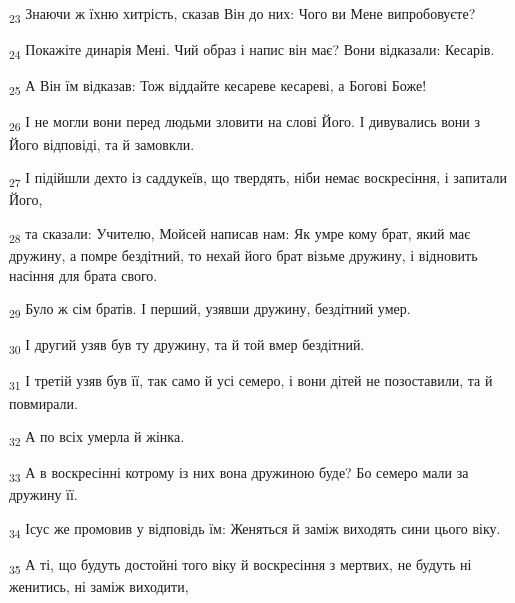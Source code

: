 \begin{tcolorbox}
\textsubscript{23} Знаючи ж їхню хитрість, сказав Він до них: Чого ви Мене випробовуєте?
\end{tcolorbox}
\begin{tcolorbox}
\textsubscript{24} Покажіте динарія Мені. Чий образ і напис він має? Вони відказали: Кесарів.
\end{tcolorbox}
\begin{tcolorbox}
\textsubscript{25} А Він їм відказав: Тож віддайте кесареве кесареві, а Богові Боже!
\end{tcolorbox}
\begin{tcolorbox}
\textsubscript{26} І не могли вони перед людьми зловити на слові Його. І дивувались вони з Його відповіді, та й замовкли.
\end{tcolorbox}
\begin{tcolorbox}
\textsubscript{27} І підійшли дехто із саддукеїв, що твердять, ніби немає воскресіння, і запитали Його,
\end{tcolorbox}
\begin{tcolorbox}
\textsubscript{28} та сказали: Учителю, Мойсей написав нам: Як умре кому брат, який має дружину, а помре бездітний, то нехай його брат візьме дружину, і відновить насіння для брата свого.
\end{tcolorbox}
\begin{tcolorbox}
\textsubscript{29} Було ж сім братів. І перший, узявши дружину, бездітний умер.
\end{tcolorbox}
\begin{tcolorbox}
\textsubscript{30} І другий узяв був ту дружину, та й той вмер бездітний.
\end{tcolorbox}
\begin{tcolorbox}
\textsubscript{31} І третій узяв був її, так само й усі семеро, і вони дітей не позоставили, та й повмирали.
\end{tcolorbox}
\begin{tcolorbox}
\textsubscript{32} А по всіх умерла й жінка.
\end{tcolorbox}
\begin{tcolorbox}
\textsubscript{33} А в воскресінні котрому із них вона дружиною буде? Бо семеро мали за дружину її.
\end{tcolorbox}
\begin{tcolorbox}
\textsubscript{34} Ісус же промовив у відповідь їм: Женяться й заміж виходять сини цього віку.
\end{tcolorbox}
\begin{tcolorbox}
\textsubscript{35} А ті, що будуть достойні того віку й воскресіння з мертвих, не будуть ні женитись, ні заміж виходити,
\end{tcolorbox}
